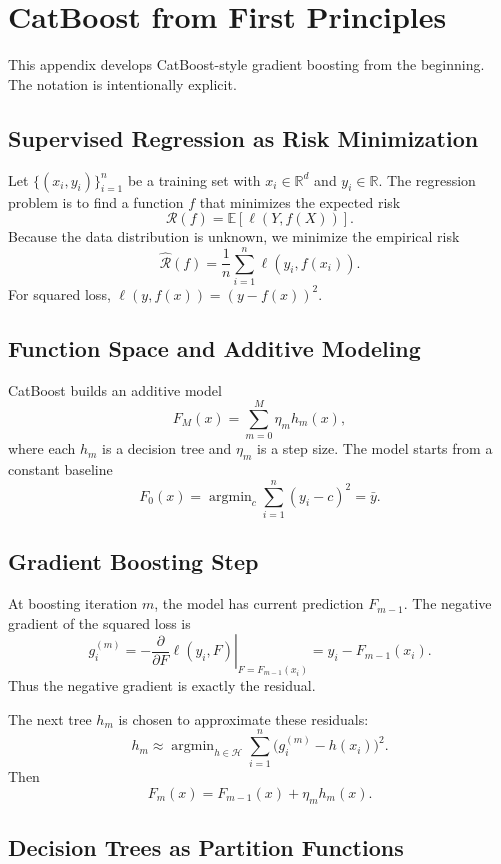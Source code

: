 \documentclass[11pt]{article}
\newcommand{\R}{\mathbb{R}}
\newcommand{\1}{\mathbf{1}}
\newcommand{\E}{\mathbb{E}}
\newcommand{\argmin}{\mathop{\mathrm{argmin}}}
\begin{document}
\appendix

\section{CatBoost from First Principles}

This appendix develops CatBoost-style gradient boosting from the beginning. The notation is intentionally explicit.

\subsection{Supervised Regression as Risk Minimization}

Let $\{(x_i,y_i)\}_{i=1}^n$ be a training set with $x_i \in \R^d$ and $y_i \in \R$. The regression problem is to find a function $f$ that minimizes the expected risk
\[
\mathcal{R}(f) = \E[\ell(Y,f(X))].
\]
Because the data distribution is unknown, we minimize the empirical risk
\[
\hat{\mathcal{R}}(f) = \frac{1}{n} \sum_{i=1}^n \ell(y_i,f(x_i)).
\]
For squared loss, $\ell(y,f(x))=(y-f(x))^2$.

\subsection{Function Space and Additive Modeling}

CatBoost builds an additive model
\[
F_M(x) = \sum_{m=0}^M \eta_m h_m(x),
\]
where each $h_m$ is a decision tree and $\eta_m$ is a step size. The model starts from a constant baseline
\[
F_0(x) = \argmin_c \sum_{i=1}^n (y_i-c)^2 = \bar y.
\]

\subsection{Gradient Boosting Step}

At boosting iteration $m$, the model has current prediction $F_{m-1}$. The negative gradient of the squared loss is
\[
g_i^{(m)} = -\left.\frac{\partial}{\partial F}\ell(y_i,F)\right|_{F=F_{m-1}(x_i)} = y_i - F_{m-1}(x_i).
\]
Thus the negative gradient is exactly the residual.

The next tree $h_m$ is chosen to approximate these residuals:
\[
h_m \approx \argmin_{h \in \mathcal{H}} \sum_{i=1}^n \big(g_i^{(m)} - h(x_i)\big)^2.
\]
Then
\[
F_m(x) = F_{m-1}(x) + \eta_m h_m(x).
\]

\subsection{Decision Trees as Partition Functions}
\end{document}
